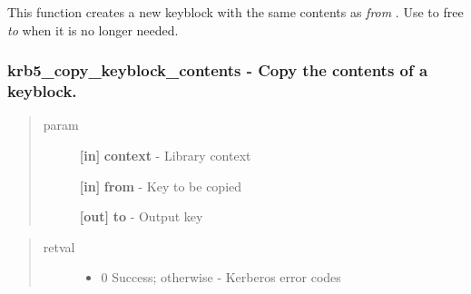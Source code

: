 \documentclass[letterpaper,10pt,english]{sphinxmanual}
\begin{document}
This function creates a new keyblock with the same contents as \emph{from} . Use {\hyperref[appdev/refs/api/krb5_free_keyblock:c.krb5_free_keyblock]{}} to free \emph{to} when it is no longer needed.


\subsubsection{krb5\_copy\_keyblock\_contents -  Copy the contents of a keyblock.}
\label{appdev/refs/api/krb5_copy_keyblock_contents:krb5-copy-keyblock-contents-copy-the-contents-of-a-keyblock}\label{appdev/refs/api/krb5_copy_keyblock_contents::doc}

\begin{fulllineitems}
\label{appdev/refs/api/krb5_copy_keyblock_contents:c.krb5_copy_keyblock_contents}
\end{fulllineitems}

\begin{quote}\begin{description}
\item[{param}] \leavevmode
\textbf{{[}in{]}} \textbf{context} - Library context

\textbf{{[}in{]}} \textbf{from} - Key to be copied

\textbf{{[}out{]}} \textbf{to} - Output key

\end{description}\end{quote}
\begin{quote}\begin{description}
\item[{retval}] \leavevmode\begin{itemize}
\item {} 
0   Success; otherwise - Kerberos error codes

\end{itemize}

\end{description}\end{quote}
\end{document}
